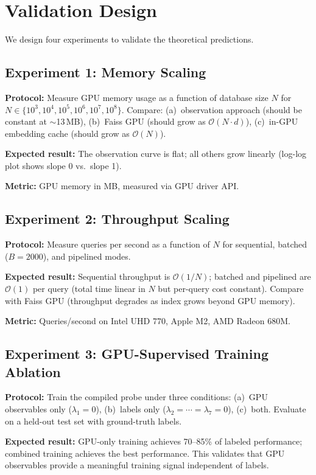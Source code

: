 \documentclass[11pt,twocolumn,a4paper]{article}
\newcommand{\BigO}{\mathcal{O}}
\begin{document}
\section{Validation Design}
\label{sec:validation}

We design four experiments to validate the theoretical predictions.

\subsection{Experiment 1: Memory Scaling}

\textbf{Protocol:} Measure GPU memory usage as a function of database
size $N$ for $N \in \{10^3, 10^4, 10^5, 10^6, 10^7, 10^8\}$.
Compare: (a)~observation approach (should be constant at $\sim$13\,MB),
(b)~Faiss GPU (should grow as $\BigO(N \cdot d)$), (c)~in-GPU
embedding cache (should grow as $\BigO(N)$).

\textbf{Expected result:} The observation curve is flat; all others
grow linearly (log-log plot shows slope 0 vs.\ slope 1).

\textbf{Metric:} GPU memory in MB, measured via GPU driver API.

\subsection{Experiment 2: Throughput Scaling}

\textbf{Protocol:} Measure queries per second as a function of $N$
for sequential, batched ($B = 2000$), and pipelined modes.

\textbf{Expected result:} Sequential throughput is $\BigO(1/N)$;
batched and pipelined are $\BigO(1)$ per query (total time linear
in $N$ but per-query cost constant). Compare with Faiss GPU
(throughput degrades as index grows beyond GPU memory).

\textbf{Metric:} Queries/second on Intel UHD 770, Apple M2,
AMD Radeon 680M.

\subsection{Experiment 3: GPU-Supervised Training Ablation}

\textbf{Protocol:} Train the compiled probe under three conditions:
(a)~GPU observables only ($\lambda_1 = 0$), (b)~labels only
($\lambda_2 = \cdots = \lambda_7 = 0$), (c)~both. Evaluate on
a held-out test set with ground-truth labels.

\textbf{Expected result:} GPU-only training achieves 70--85\% of
labeled performance; combined training achieves the best performance.
This validates that GPU observables provide a meaningful training
signal independent of labels.
\end{document}
